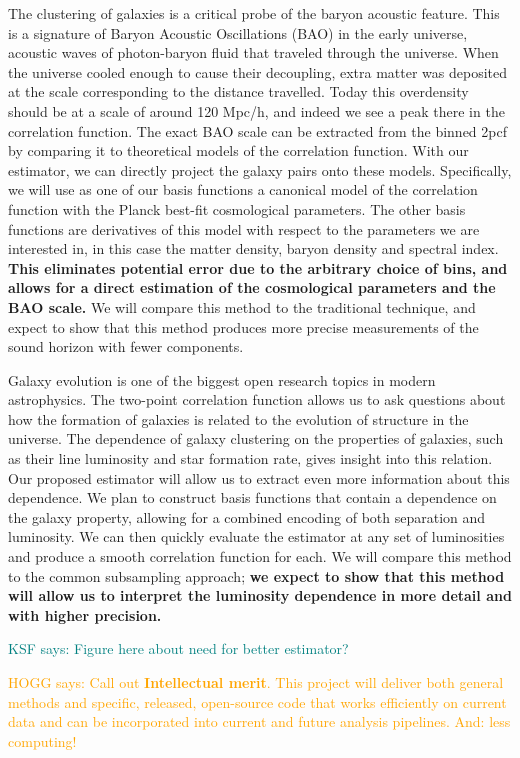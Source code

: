 \documentclass[12pt, fullpage, letterpaper]{article}
\newcommand{\KSF}[1]{\textcolor{teal}{KSF says: #1}}
\newcommand{\HOGG}[1]{\textcolor{orange}{HOGG says: #1}}
\newcommand{\cf}{2pcf\xspace}
\begin{document}
The clustering of galaxies is a critical probe of the baryon acoustic feature. 
This is a signature of Baryon Acoustic Oscillations (BAO) in the early universe, acoustic waves of photon-baryon fluid that traveled through the universe. 
When the universe cooled enough to cause their decoupling, extra matter was deposited at the scale corresponding to the distance travelled. 
Today this overdensity should be at a scale of around 120 Mpc/h, and indeed we see a peak there in the correlation function. 
The exact BAO scale can be extracted from the binned \cf by comparing it to theoretical models of the correlation function. 
With our estimator, we can directly project the galaxy pairs onto these models. 
Specifically, we will use as one of our basis functions a canonical model of the correlation function with the Planck best-fit cosmological parameters. 
The other basis functions are derivatives of this model with respect to the parameters we are interested in, in this case the matter density, baryon density and spectral index.
\textbf{This eliminates potential error due to the arbitrary choice of bins, and allows for a direct estimation of the cosmological parameters and the BAO scale.}
We will compare this method to the traditional technique, and expect to show that this method produces more precise measurements of the sound horizon with fewer components.

Galaxy evolution is one of the biggest open research topics in modern astrophysics.
The two-point correlation function allows us to ask questions about how the formation of galaxies is related to the evolution of structure in the universe.
The dependence of galaxy clustering on the properties of galaxies, such as their line luminosity and star formation rate, gives insight into this relation.
Our proposed estimator will allow us to extract even more information about this dependence. 
We plan to construct basis functions that contain a dependence on the galaxy property, allowing for a combined encoding of both separation and luminosity. 
We can then quickly evaluate the estimator at any set of luminosities and produce a smooth correlation function for each. 
We will compare this method to the common subsampling approach; \textbf{we expect to show that this method will allow us to interpret the luminosity dependence in more detail and with higher precision.}

\KSF{Figure here about need for better estimator?}

\HOGG{Call out \textbf{Intellectual merit}.
This project will deliver both general methods and specific, released,
open-source code that works efficiently on current data and can be
incorporated into current and future analysis pipelines. And: less computing!}
\end{document}
